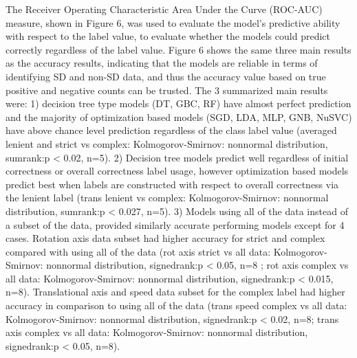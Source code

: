 \documentclass[11pt, onecolumn]{article}
\begin{document}

The Receiver Operating Characteristic Area Under the Curve (ROC-AUC) measure, shown in Figure 6, was used to evaluate the model's predictive ability with respect to the label value, to evaluate whether the models could predict correctly regardless of the label value.  Figure 6 shows the same three main results as the accuracy results, indicating that the models are reliable in terms of identifying SD and non-SD data, and thus the accuracy value based on true positive and negative counts can be trusted.  The 3 summarized main results were: 1) decision tree type models (DT, GBC, RF) have almost perfect prediction and the majority of optimization based models (SGD, LDA, MLP, GNB, NuSVC) have above chance level prediction regardless of the class label value (averaged lenient and strict vs complex:  Kolmogorov-Smirnov: nonnormal distribution, sumrank:p < 0.02, n=5). 2) Decision tree models predict well regardless of initial correctness or overall correctness label usage, however optimization based models predict best when labels are constructed with respect to overall correctness via the lenient label (trans lenient vs complex: Kolmogorov-Smirnov: nonnormal distribution, sumrank:p < 0.027, n=5).  3) Models using all of the data instead of a subset of the data, provided similarly accurate performing models except for 4 cases.  Rotation axis data subset had higher accuracy for strict and complex compared with using all of the data (rot axis strict vs all data: Kolmogorov-Smirnov: nonnormal distribution, signedrank:p < 0.05, n=8 ; rot axis complex vs all data: Kolmogorov-Smirnov: nonnormal distribution, signedrank:p < 0.015, n=8).  Translational axis and speed data subset for the complex label had higher accuracy in comparison to using all of the data  (trans speed complex vs all data: Kolmogorov-Smirnov: nonnormal distribution, signedrank:p < 0.02, n=8; trans axis complex vs all data: Kolmogorov-Smirnov: nonnormal distribution, signedrank:p < 0.05, n=8).
\end{document}
